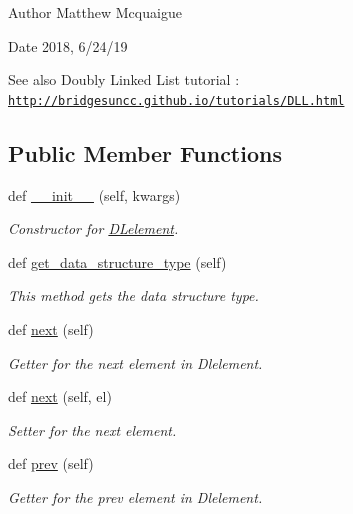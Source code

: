 \begin{DoxyAuthor}{Author}
Matthew Mcquaigue 
\end{DoxyAuthor}
\begin{DoxyDate}{Date}
2018, 6/24/19
\end{DoxyDate}
\begin{DoxySeeAlso}{See also}
Doubly Linked List tutorial \+: \href{http://bridgesuncc.github.io/tutorials/DLL.html}{\tt http\+://bridgesuncc.\+github.\+io/tutorials/\+D\+L\+L.\+html} 
\end{DoxySeeAlso}
\subsection*{Public Member Functions}
\begin{DoxyCompactItemize}
\item 
def \hyperlink{classbridges_1_1dl__element_1_1_d_lelement_a1ade3543dee3c48d6030125b37f993bb}{\+\_\+\+\_\+init\+\_\+\+\_\+} (self, kwargs)
\begin{DoxyCompactList}\small\item\em Constructor for \hyperlink{classbridges_1_1dl__element_1_1_d_lelement}{D\+Lelement}. \end{DoxyCompactList}\item 
def \hyperlink{classbridges_1_1dl__element_1_1_d_lelement_a5fb177ed67b75e606ac303f7a972d301}{get\+\_\+data\+\_\+structure\+\_\+type} (self)
\begin{DoxyCompactList}\small\item\em This method gets the data structure type. \end{DoxyCompactList}\item 
def \hyperlink{classbridges_1_1dl__element_1_1_d_lelement_a43077e810ec453c9cd512ba75819e28a}{next} (self)
\begin{DoxyCompactList}\small\item\em Getter for the next element in Dlelement. \end{DoxyCompactList}\item 
def \hyperlink{classbridges_1_1dl__element_1_1_d_lelement_ae46f630cd7384689d4305770e6b2c7c1}{next} (self, el)
\begin{DoxyCompactList}\small\item\em Setter for the next element. \end{DoxyCompactList}\item 
def \hyperlink{classbridges_1_1dl__element_1_1_d_lelement_a66e7c4bfb2216a68744fe58c24e9917f}{prev} (self)
\begin{DoxyCompactList}\small\item\em Getter for the prev element in Dlelement. \end{DoxyCompactList}\item 

\end{DoxyCompactItemize}
